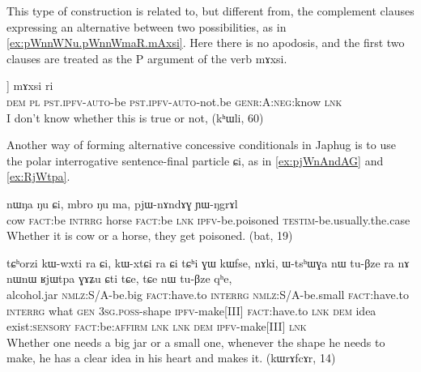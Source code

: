 \documentclass[oldfontcommands,oneside,a4paper,11pt]{article}
\newcommand{\ipa}[1]{{\phon \mbox{#1}}} %
\begin{document}
This type of construction is related to, but different from, the complement clauses expressing an alternative between two possibilities, as in \ref{ex:pWnnWNu.pWnnWmaR.mAxsi}. Here there is no apodosis, and the first two clauses are treated as the P argument of the verb \ipa{mɤxsi}.

\begin{exe}
\ex  \label{ex:pWnnWNu.pWnnWmaR.mAxsi}
\gll
 [[\ipa{nɯ} \ipa{ra}  	 \ipa{pɯ-nnɯ-ŋu}]  	 [\ipa{pɯ-nnɯ-maʁ}]]   	\ipa{mɤxsi}  \ipa{ri}\\
\textsc{dem} \textsc{pl} \textsc{pst.ipfv-auto}-be \textsc{pst.ipfv-auto}-not.be \textsc{genr:A:neg}:know \textsc{lnk} \\
\glt I don't know whether this is true or not, (kʰɯli, 60)
\end{exe}

Another way of forming alternative concessive conditionals in Japhug is to use the polar interrogative sentence-final particle \ipa{ɕi}, as in \ref{ex:pjWnAndAG} and \ref{ex:RjWtpa}.
\begin{exe}
\ex  \label{ex:pjWnAndAG}
\gll
\ipa{nɯŋa}   	\ipa{ŋu}   	\ipa{ɕi,}   	\ipa{mbro}   	\ipa{ŋu}   	\ipa{ma,}   	\ipa{pjɯ-nɤndɤɣ}   	\ipa{ɲɯ-ŋgrɤl}   \\
cow \textsc{fact}:be \textsc{intrrg} horse  \textsc{fact}:be \textsc{lnk} \textsc{ipfv}-be.poisoned \textsc{testim}-be.usually.the.case \\
\glt Whether it is cow or a horse, they get poisoned. (bat, 19)
\end{exe}

\begin{exe}
\ex  \label{ex:RjWtpa}
\gll
\ipa{tɕʰorzi}   	\ipa{kɯ-wxti}   	\ipa{ra}   	\ipa{ɕi,}   	\ipa{kɯ-xtɕi}   	\ipa{ra}   	\ipa{ɕi}   	\ipa{tɕʰi}   	\ipa{ɣɯ}   	\ipa{kɯfse,}   	\ipa{nɤki,}   	\ipa{ɯ-tsʰɯɣa}   	\ipa{nɯ}   	\ipa{tu-βze}   	\ipa{ra}   	\ipa{nɤ}   	\ipa{nɯnɯ}   	\ipa{ʁjɯtpa}   	\ipa{ɣɤʑu}   	\ipa{ɕti}   	\ipa{tɕe,}   	\ipa{tɕe}   	\ipa{nɯ}   	\ipa{tu-βze}   	\ipa{qʰe,}   \\
alcohol.jar \textsc{nmlz}:S/A-be.big \textsc{fact}:have.to \textsc{interrg} \textsc{nmlz}:S/A-be.small \textsc{fact}:have.to \textsc{interrg} what \textsc{gen} \textsc{3sg.poss}-shape \textsc{ipfv}-make[III]  \textsc{fact}:have.to \textsc{lnk} \textsc{dem} idea
exist:\textsc{sensory} \textsc{fact}:be:\textsc{affirm} \textsc{lnk} \textsc{lnk} \textsc{dem} \textsc{ipfv}-make[III]  \textsc{lnk} \\
\glt Whether one needs a big jar or a small one, whenever the shape he needs to make, he has a clear idea in his heart and makes it. (kɯrɤfcɤr, 14)
\end{exe}
\end{document}
